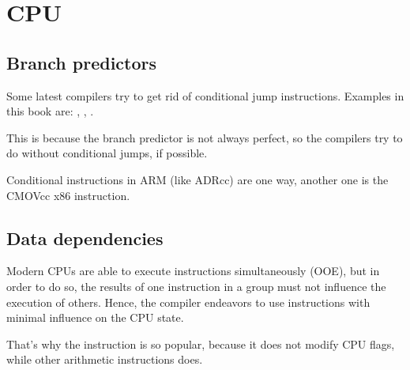 ﻿\section{CPU}

\subsection{Branch predictors}
\label{branch_predictors}

Some latest compilers try to get rid of conditional jump instructions.
Examples in this book are: , , .

This is because the branch predictor is not always perfect, so the compilers try to do 
without conditional jumps, if possible.

Conditional instructions in ARM (like ADRcc) are one way, another one is the CMOVcc x86 instruction.

\subsection{Data dependencies}

Modern CPUs are able to execute instructions simultaneously (\ac{OOE}), but in order to do so,
the results of one instruction in a group must not influence the execution of others.
Hence, the compiler endeavors to use instructions with minimal influence on the CPU state.

That's why the \LEA instruction is so popular, because it does not modify CPU flags, while
other arithmetic instructions does.

